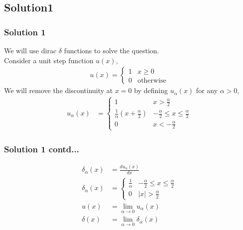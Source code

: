 \documentclass{beamer}
\begin{document}
\subsection*{Solution1}
\begin{frame}[fragile]
\frametitle{Solution 1}
\begin{flushleft}
We will use dirac $\delta$ functions to solve the question.\\
Consider a unit step function $u(x)$,
\begin{align}
u(x) = 
    \begin{cases}
        1 & x \geq 0 \\
        0 & \text{otherwise}
    \end{cases}
\end{align}
We will remove the discontinuity at $x=0$ by defining $u_{\alpha}(x)$ for any $\alpha > 0$,
\begin{align}
u_{\alpha}(x) &= 
    \begin{cases}
        1 & x > \frac{\alpha}{2} \\
        \frac{1}{\alpha}(x + \frac{\alpha}{2}) & -\frac{\alpha}{2} \leq x \leq \frac{\alpha}{2} \\
        0 & x < -\frac{\alpha}{2}
    \end{cases}
\end{align}
\end{flushleft}
\end{frame}
\begin{frame}[fragile]
\frametitle{Solution 1 contd...}
\begin{flushleft}
\begin{align}
\delta_{\alpha}(x) &= \frac{du_{\alpha}(x)}{dx}\\
\delta_{\alpha}(x) &=
    \begin{cases}
        \frac{1}{\alpha} & -\frac{\alpha}{2} \leq x \leq \frac{\alpha}{2} \\
        0 & |x| > \frac{\alpha}{2}
    \end{cases}\\
u(x) &= \lim_{\alpha \to 0} u_{\alpha}(x)\\
\delta (x) &= \lim_{\alpha \to 0} \delta_{\alpha}(x)
\end{align}
\end{flushleft}
\end{frame}
\end{document}
